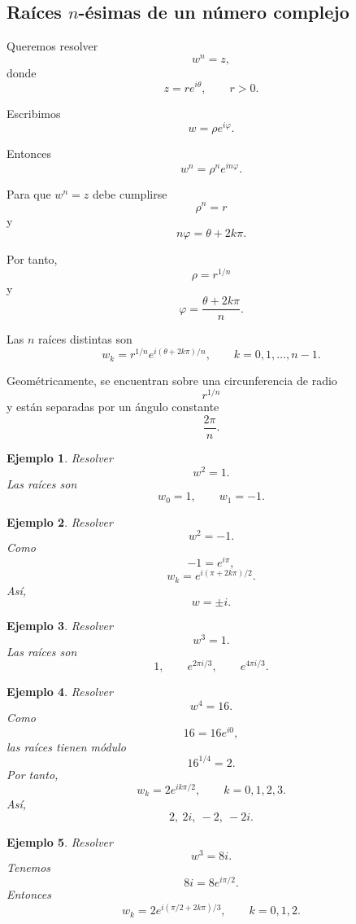 \documentclass[12pt]{article}
\newtheorem{Ejem}{Ejemplo}
\begin{document}
\subsection*{Raíces $n$-ésimas de un número complejo}

Queremos resolver
\[
w^n=z,
\]
donde
\[
z=re^{i\theta},
\qquad
r>0.
\]

Escribimos
\[
w=\rho e^{i\varphi}.
\]

Entonces
\[
w^n
=
\rho^ne^{in\varphi}.
\]

Para que $w^n=z$ debe cumplirse
\[
\rho^n=r
\]
y
\[
n\varphi
=
\theta+2k\pi.
\]

Por tanto,
\[
\rho=r^{1/n}
\]
y
\[
\varphi
=
\frac{\theta+2k\pi}{n}.
\]

Las $n$ raíces distintas son
\[
\boxed{
w_k
=
r^{1/n}
e^{i(\theta+2k\pi)/n},
\qquad
k=0,1,\ldots,n-1.
}
\]

Geométricamente, se encuentran sobre una circunferencia de radio
\[
r^{1/n}
\]
y están separadas por un ángulo constante
\[
\frac{2\pi}{n}.
\]

\begin{Ejem}

Resolver
\[
w^2=1.
\]
Las raíces son
\[
w_0=1,
\qquad
w_1=-1.
\]

\end{Ejem}


\begin{Ejem}
Resolver
\[
w^2=-1.
\]
Como
\[
-1=e^{i\pi},
\]
\[
w_k
=
e^{i(\pi+2k\pi)/2}.
\]
Así,
\[
\boxed{w=\pm i}.
\]

\end{Ejem}


\begin{Ejem}
Resolver
\[
w^3=1.
\]
Las raíces son
\[
1,
\qquad
e^{2\pi i/3},
\qquad
e^{4\pi i/3}.
\]

\end{Ejem}


\begin{Ejem}
Resolver
\[
w^4=16.
\]
Como
\[
16=16e^{i0},
\]
las raíces tienen módulo
\[
16^{1/4}=2.
\]
Por tanto,
\[
w_k
=
2e^{ik\pi/2},
\qquad k=0,1,2,3.
\]
Así,
\[
\boxed{2,\ 2i,\ -2,\ -2i}.
\]

\end{Ejem}


\begin{Ejem}
Resolver
\[
w^3=8i.
\]
Tenemos
\[
8i=8e^{i\pi/2}.
\]
Entonces
\[
w_k
=
2e^{i(\pi/2+2k\pi)/3},
\qquad k=0,1,2.
\]
\end{Ejem}
\end{document}
